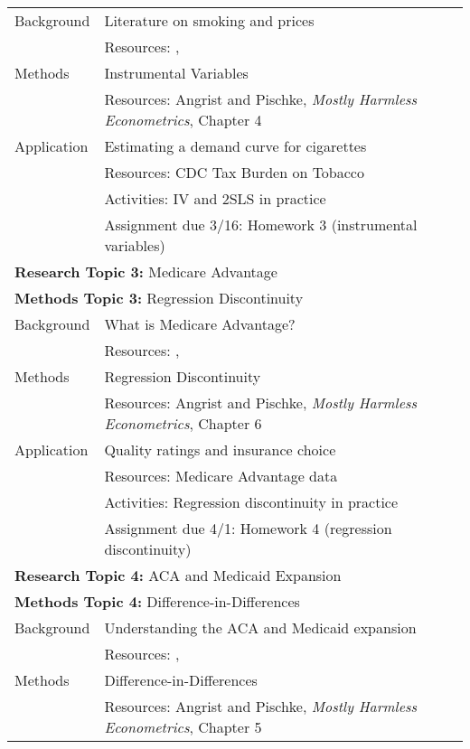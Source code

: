 \documentclass{article}
\begin{document}
\begin{longtable}{lp{13cm}}
  \hline\hline
  Background & Literature on smoking and prices\\
             & Resources: \cite{gruber2001}, \cite{ross2003} \\
  \hline
  Methods & Instrumental Variables \\
          & Resources: Angrist and Pischke, \textit{Mostly Harmless Econometrics}, Chapter 4 \\
  \hline
  Application & Estimating a demand curve for cigarettes \\
              & Resources: CDC Tax Burden on Tobacco \\
              & Activities: IV and 2SLS in practice \citep{ross2003} \\
              & Assignment due 3/16: Homework 3 (instrumental variables) \\
  \hline
  \multicolumn{2}{l}{\textbf{Research Topic 3:} Medicare Advantage} \\
  \multicolumn{2}{l}{\textbf{Methods Topic 3:} Regression Discontinuity} \\
  \hline\hline
  Background & What is Medicare Advantage? \\
             & Resources: \cite{darden2015}, \cite{gruber2017} \\
  \hline
  Methods & Regression Discontinuity \\
          & Resources: Angrist and Pischke, \textit{Mostly Harmless Econometrics}, Chapter 6 \\
  \hline
  Application & Quality ratings and insurance choice \\
              & Resources: Medicare Advantage data \\
              & Activities: Regression discontinuity in practice \citep{darden2015} \\
              & Assignment due 4/1: Homework 4 (regression discontinuity) \\
  \hline
  \multicolumn{2}{l}{\textbf{Research Topic 4:} ACA and Medicaid Expansion} \\
  \multicolumn{2}{l}{\textbf{Methods Topic 4:} Difference-in-Differences} \\
  \hline\hline
  Background & Understanding the ACA and Medicaid expansion\\
             & Resources: \cite{obama2016}, \cite{courtemanche2017} \\
  \hline
  Methods & Difference-in-Differences \\
          & Resources: Angrist and Pischke, \textit{Mostly Harmless Econometrics}, Chapter 5 \\

\end{longtable}
\end{document}
